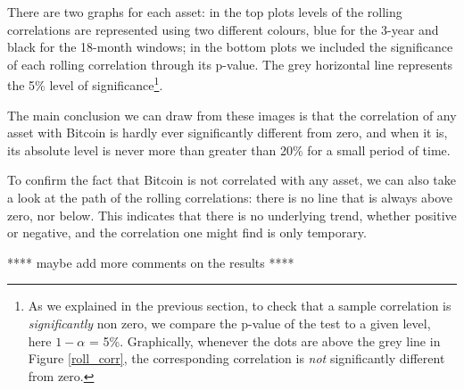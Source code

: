 There are two graphs for each asset: in the top plots levels of the rolling correlations are represented using two different colours, blue for the 3-year and black for the 18-month windows; in the bottom plots we included the significance of each rolling correlation through its p-value. The grey horizontal line represents the 5\% level of significance\footnote{As we explained in the previous section, to check that a sample correlation is \textit{significantly} non zero, we compare the p-value of the test to a given level, here $1- \alpha$ = 5\%. Graphically, whenever the dots are above the grey line in Figure \ref{roll_corr}, the corresponding correlation is \textit{not} significantly different from zero.}. 

The main conclusion we can draw from these images is that the correlation of any asset with Bitcoin is hardly ever significantly different from zero, and when it is, its absolute level is never more than greater than 20\% for a small period of time.

To confirm the fact that Bitcoin is not correlated with any asset, we can also take a look at the path of the rolling correlations: there is no line that is always above zero, nor below. This indicates that there is no underlying trend, whether positive or negative, and the correlation one might find is only temporary.

**** maybe add more comments on the results ****



